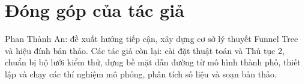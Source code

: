 
\section{Đóng góp của tác giả}

Phan Thành An: đề xuất hướng tiếp cận, xây dựng cơ sở lý thuyết Funnel Tree và hiệu
đính bản thảo. Các tác giả còn lại: cài đặt thuật toán và Thủ tục 2, chuẩn bị bộ
lưới kiểm thử, dựng bề mặt dẫn đường từ mô hình thành phố, thiết lập và chạy các
thí nghiệm mô phỏng, phân tích số liệu và soạn bản thảo.
